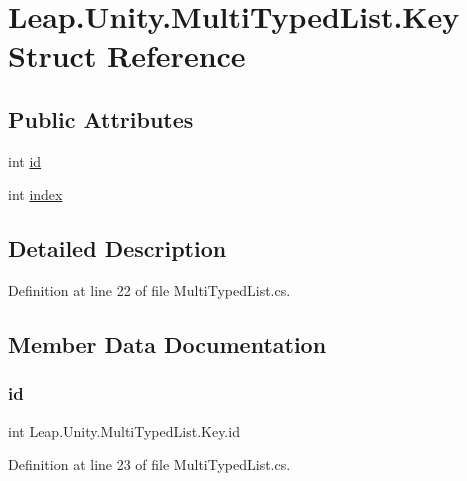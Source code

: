 \hypertarget{struct_leap_1_1_unity_1_1_multi_typed_list_1_1_key}{}\section{Leap.\+Unity.\+Multi\+Typed\+List.\+Key Struct Reference}
\label{struct_leap_1_1_unity_1_1_multi_typed_list_1_1_key}
\subsection*{Public Attributes}
\begin{DoxyCompactItemize}
\item 
int \mbox{\hyperlink{struct_leap_1_1_unity_1_1_multi_typed_list_1_1_key_a740484bda1c191822ff68ac0eb936b6d}{id}}
\item 
int \mbox{\hyperlink{struct_leap_1_1_unity_1_1_multi_typed_list_1_1_key_af01495250bad0b8c6c03ecc25ae6303d}{index}}
\end{DoxyCompactItemize}


\subsection{Detailed Description}


Definition at line 22 of file Multi\+Typed\+List.\+cs.



\subsection{Member Data Documentation}
\mbox{\label{struct_leap_1_1_unity_1_1_multi_typed_list_1_1_key_a740484bda1c191822ff68ac0eb936b6d}} 
\subsubsection{\texorpdfstring{id}{id}}
{\footnotesize\ttfamily int Leap.\+Unity.\+Multi\+Typed\+List.\+Key.\+id}



Definition at line 23 of file Multi\+Typed\+List.\+cs.

\mbox{\label{struct_leap_1_1_unity_1_1_multi_typed_list_1_1_key_af01495250bad0b8c6c03ecc25ae6303d}} 
